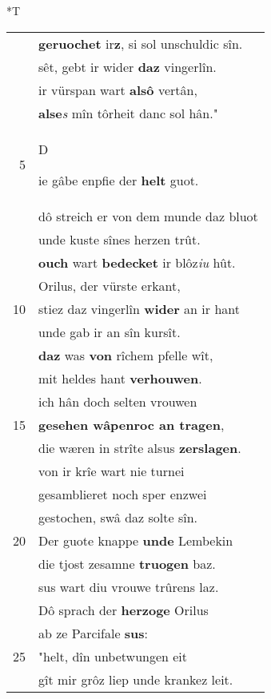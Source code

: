 \documentclass[8pt,a4paper,notitlepage]{article}
\begin{document}
\begin{table}[ht]
\begin{minipage}[t]{0.5\linewidth}
\end{minipage}
\hspace{0.5cm}
\begin{minipage}[t]{0.5\linewidth}
\small
\begin{center}*T
\end{center}
\begin{tabular}{rl}
 & \textbf{geruochet} ir\textbf{z}, si sol unschuldic sîn.\\ 
 & sêt, gebt ir wider \textbf{daz} vingerlîn.\\ 
 & ir vürspan wart \textbf{alsô} vertân,\\ 
 & \textbf{alse}\textit{s} mîn tôrheit danc sol hân."\\ 
5 & \begin{large}D\end{large}ie gâbe enpfie der \textbf{helt} guot.\\ 
 & dô streich er von dem munde daz bluot\\ 
 & unde kuste sînes herzen trût.\\ 
 & \textbf{ouch} wart \textbf{bedecket} ir blôz\textit{iu} hût.\\ 
 & Orilus, der vürste erkant,\\ 
10 & stiez daz vingerlîn \textbf{wider} an ir hant\\ 
 & unde gab ir an sîn kursît.\\ 
 & \textbf{daz} was \textbf{von} rîchem pfelle wît,\\ 
 & mit heldes hant \textbf{verhouwen}.\\ 
 & ich hân doch selten vrouwen\\ 
15 & \textbf{gesehen wâpenroc an tragen},\\ 
 & die wæren in strîte alsus \textbf{zerslagen}.\\ 
 & von ir krîe wart nie turnei\\ 
 & gesamblieret noch sper enzwei\\ 
 & gestochen, swâ daz solte sîn.\\ 
20 & Der guote knappe \textbf{unde} Lembekin\\ 
 & die tjost zesamne \textbf{truogen} baz.\\ 
 & sus wart diu vrouwe trûrens laz.\\ 
 & Dô sprach der \textbf{herzoge} Orilus\\ 
 & ab ze Parcifale \textbf{sus}:\\ 
25 & "helt, dîn unbetwungen eit\\ 
 & gît mir grôz liep unde krankez leit.\\ 

\end{tabular}
\end{minipage}
\end{table}
\end{document}
